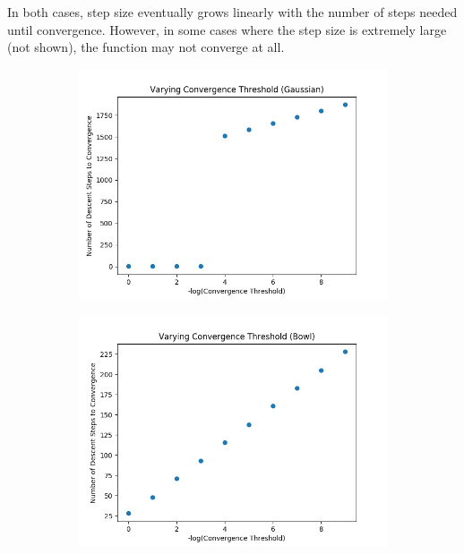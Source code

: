 \documentclass[8pt]{article}
\begin{document}
%
In both cases, step size eventually grows linearly with the number of steps needed until convergence. However, in some cases where the step size is extremely large (not shown), the function may not converge at all.
%
\begin{figure}[H]
\centering
        \begin{subfigure}[b]{0.38\textwidth}
                \includegraphics[width=\linewidth]{../P1/figs/converge_gauss.png}
        \end{subfigure}%
        \begin{subfigure}[b]{0.38\textwidth}
                \includegraphics[width=\linewidth]{../P1/figs/converge_bowl.png}
        \end{subfigure}%
\end{figure}
\end{document}
